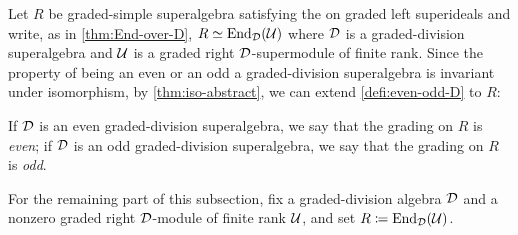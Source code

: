 
Let $R$ be graded-simple superalgebra satisfying the \dcc on graded left superideals and write, as in \cref{thm:End-over-D}, $R\simeq \operatorname{End}_{\mathcal{D}} (\mathcal U)$ where $\mathcal{D}$ is a graded-division superalgebra and $\mathcal U$ is a graded right $\mathcal{D}$-supermodule of finite rank. 
Since the property of being an even or an odd a graded-division superalgebra is invariant under isomorphism, by \cref{thm:iso-abstract}, we can extend \cref{defi:even-odd-D} to $R$:

\begin{defi}\label{defi:even-odd-R}
    If $\mathcal{D}$ is an even graded-division superalgebra, we say that the grading on $R$ is \emph{even}; if $\mathcal{D}$ is an odd graded-division superalgebra, we say that the grading on $R$ is \emph{odd}. 
\end{defi}

For the remaining part of this subsection, fix a graded-division algebra $\mathcal{D}$ and a nonzero graded right $\mathcal{D}$-module of finite rank $\mathcal U$, and set $R \coloneqq \operatorname{End}_{\mathcal{D}} (\mathcal U)$. 

